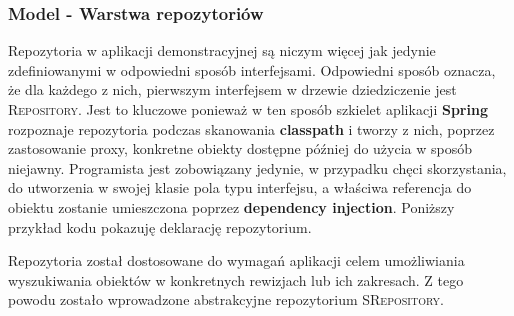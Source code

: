 		\subsubsection{Model - Warstwa repozytoriów}
			Repozytoria w aplikacji demonstracyjnej są niczym więcej jak jedynie zdefiniowanymi w odpowiedni sposób interfejsami. 
			Odpowiedni sposób oznacza, że dla każdego z nich, pierwszym interfejsem w drzewie dziedziczenie jest \textsc{Repository}. 
			Jest to kluczowe ponieważ w ten sposób szkielet aplikacji \textbf{Spring} rozpoznaje repozytoria podczas
			skanowania \textbf{classpath} i tworzy z nich, poprzez zastosowanie proxy, konkretne obiekty dostępne później do użycia 
			w sposób niejawny. Programista jest zobowiązany jedynie, w przypadku chęci skorzystania, do utworzenia w swojej klasie
			pola typu interfejsu, a właściwa referencja do obiektu zostanie umieszczona poprzez \textbf{dependency injection}. 
			Poniższy przykład kodu pokazuję deklarację repozytorium. 
			
			Repozytoria został dostosowane do wymagań aplikacji celem umożliwiania wyszukiwania obiektów w konkretnych rewizjach lub 
			ich zakresach. Z tego powodu zostało wprowadzone abstrakcyjne repozytorium \textsc{SRepository}.
			
